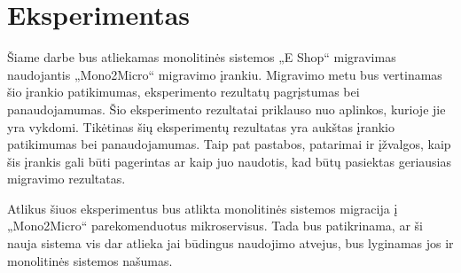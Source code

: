 \documentclass{VUMIFPSbakalaurinis}
\begin{document}
\section{Eksperimentas}
Šiame darbe bus atliekamas monolitinės sistemos „E Shop“ migravimas naudojantis „Mono2Micro“ migravimo įrankiu. Migravimo metu bus vertinamas šio įrankio patikimumas, eksperimento rezultatų pagrįstumas bei panaudojamumas. Šio eksperimento rezultatai priklauso nuo aplinkos, kurioje jie yra vykdomi. Tikėtinas šių eksperimentų rezultatas yra aukštas įrankio patikimumas bei panaudojamumas. Taip pat pastabos, patarimai ir įžvalgos, kaip šis įrankis gali būti pagerintas ar kaip juo naudotis, kad būtų pasiektas geriausias migravimo rezultatas.

Atlikus šiuos eksperimentus bus atlikta monolitinės sistemos migracija į „Mono2Micro“ parekomenduotus mikroservisus. Tada bus patikrinama, ar ši nauja sistema vis dar atlieka jai būdingus naudojimo atvejus, bus lyginamas jos ir monolitinės sistemos našumas.




\end{document}
